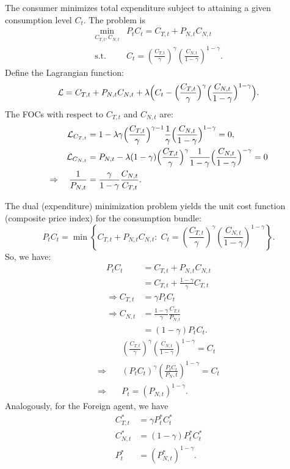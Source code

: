 \documentclass[a4paper,12pt]{article} %
\theoremstyle{nonitalic}
\begin{document}
The consumer minimizes total expenditure subject to attaining a given consumption level $C_t$. The problem is
\begin{align*}
    \min_{C_{T,t}, C_{N,t}} & P_t C_t = C_{T,t} + P_{N,t} C_{N,t} \\
    \text{s.t.} \quad &C_t = \left(\frac{C_{T,t}}{\gamma } \right)^{\gamma} \left(\frac{C_{N,t}}{1 - \gamma} \right)^{ 1-\gamma}.
\end{align*}
Define the Lagrangian function:
\[
\mathcal{L} = C_{T,t} + P_{N,t} C_{N,t} + \lambda \Bigl(C_t - \Bigl(\frac{C_{T,t}}{\gamma } \Bigr)^{\gamma} \Bigl(\frac{C_{N,t}}{1 - \gamma} \Bigr)^{ 1-\gamma}\Bigr).
\]
The FOCs with respect to $C_{T,t}$ and $C_{N,t}$ are:
\begin{align*}
    \mathcal{L}_{C_{T,t}} & = 1 - \lambda \gamma \Bigl(\frac{C_{T,t}}{\gamma } \Bigr)^{\gamma-1} \frac{1}{\gamma} \Bigl(\frac{C_{N,t}}{1 - \gamma} \Bigr)^{ 1-\gamma} = 0, \\
    \mathcal{L}_{C_{N,t}} & = P_{N,t} - \lambda (1-\gamma) \Bigl(\frac{C_{T,t}}{\gamma } \Bigr)^{\gamma} \frac{1}{1-\gamma} \Bigl(\frac{C_{N,t}}{1 - \gamma} \Bigr)^{ -\gamma} = 0 \\
    \Rightarrow \quad \frac{1}{P_{N,t}} & = \frac{\gamma}{1-\gamma} \frac{C_{N,t}}{C_{T,t}}.
\end{align*}

The dual (expenditure) minimization problem yields the unit cost function (composite price index) for the consumption bundle:
\[
P_t C_t = \min \left\{ C_{T,t} + P_{N,t} C_{N,t} : \; C_t = \left(\frac{C_{T,t}}{\gamma } \right)^{\gamma} \left(\frac{C_{N,t}}{1 - \gamma} \right)^{ 1-\gamma} \right\}.
\]
So, we have:
\begin{align*}
    P_t C_t & = C_{T,t} + P_{N,t} C_{N,t} \\
    &= C_{T,t} + \frac{1-\gamma}{\gamma} C_{T,t} \\
    \Rightarrow C_{T,t} &= \gamma P_t C_t \\
    \Rightarrow C_{N,t} &= \frac{1-\gamma}{\gamma} \frac{C_{T,t}}{P_{N,t}}\\
    &= (1-\gamma) P_t C_t.
\end{align*}
\begin{align*}
    & \left(\frac{C_{T,t}}{\gamma } \right)^{\gamma} \left(\frac{C_{N,t}}{1 - \gamma} \right)^{ 1-\gamma} = C_t \\
    \Rightarrow \quad & (P_t C_t)^{\gamma} \left(\frac{P_t C_t}{P_N,t}\right)^{1-\gamma} = C_t \\
    \Rightarrow \quad & P_t = (P_{N,t})^{1-\gamma}. 
\end{align*}
Analogously, for the Foreign agent, we have 
\begin{align*}
    C^*_{T,t} &= \gamma P^*_t C^*_t \\
    C^*_{N,t} &= (1-\gamma) P^*_t C^*_t \\
    P^*_t &= (P^*_{N,t})^{1-\gamma}.
\end{align*}
\end{document}
